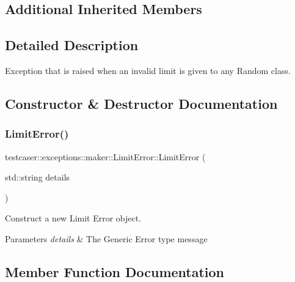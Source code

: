 \subsection*{Additional Inherited Members}


\subsection{Detailed Description}
Exception that is raised when an invalid limit is given to any Random class. 



\subsection{Constructor \& Destructor Documentation}
\mbox{\label{classtestcaser_1_1exceptions_1_1maker_1_1LimitError_a93442165f498e8910b4c2170a05d3b3a}} 
\subsubsection{\texorpdfstring{LimitError()}{LimitError()}}
{\footnotesize\ttfamily testcaser\+::exceptions\+::maker\+::\+Limit\+Error\+::\+Limit\+Error (\begin{DoxyParamCaption}\item[{std\+::string}]{details }\end{DoxyParamCaption})\hspace{0.3cm}{\ttfamily [inline]}}



Construct a new Limit Error object. 


\begin{DoxyParams}{Parameters}
{\em details} & The Generic Error type message \\
\hline
\end{DoxyParams}


\subsection{Member Function Documentation}
\mbox{\label{classtestcaser_1_1exceptions_1_1maker_1_1LimitError_adb0f0c92f0d78b26f4310301f97bff3a}} 
